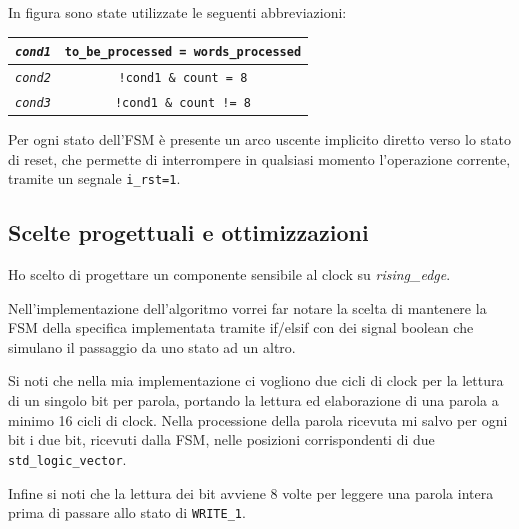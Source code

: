 \documentclass{article}
\begin{document}
In figura sono state utilizzate le seguenti abbreviazioni:
\vspace{-.1cm}
    \def\arraystretch{1.2} %
    \begin{tabular}{||c|c||}
        \hline
        \texttt{\emph{cond1}} & \texttt{to\_be\_processed = words\_processed}                  \\\hline
        \texttt{\emph{cond2}} & \texttt{!cond1 \& count = 8}                                             \\\hline
        \texttt{\emph{cond3}} & \texttt{!cond1 \& count != 8}                                             \\\hline
    \end{tabular}
\vspace{0,2cm}

Per ogni stato dell'FSM è presente un arco uscente implicito diretto verso lo stato di reset, che permette di interrompere in qualsiasi momento l'operazione corrente, tramite un segnale \texttt{i\_rst=1}.
\vspace{0,2cm}

\subsection{Scelte progettuali e ottimizzazioni} %
Ho scelto di progettare un componente sensibile al clock su \emph{rising\_edge}.\par
Nell’implementazione dell’algoritmo vorrei far notare la scelta di mantenere la FSM della specifica implementata tramite if/elsif con dei signal boolean che simulano il passaggio da uno stato ad un altro.

Si noti che nella mia implementazione ci vogliono due cicli di clock per la lettura di un singolo bit per parola, portando la lettura ed elaborazione di una parola a minimo 16 cicli di clock.
Nella processione della parola ricevuta mi salvo per ogni bit i due bit, ricevuti dalla FSM, nelle posizioni corrispondenti di due \texttt{std\_logic\_vector}.

Infine si noti che la lettura dei bit avviene 8 volte per leggere una parola intera prima di passare allo stato di \texttt{WRITE\_1}.

\pagebreak
\end{document}
